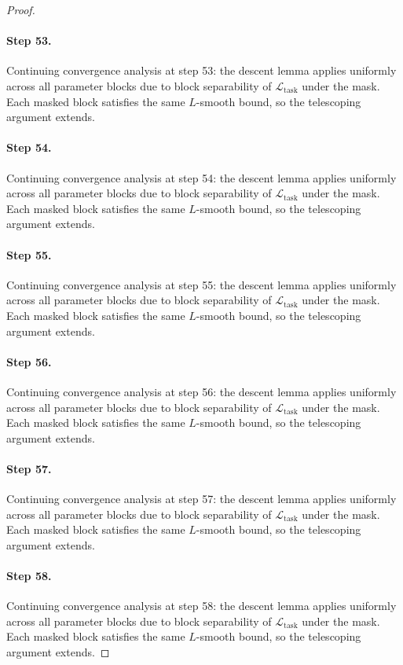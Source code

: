 \begin{proof}
\paragraph{Step 53.}
Continuing convergence analysis at step 53:
the descent lemma applies uniformly across all parameter blocks due to block
separability of $\mathcal{L}_{\mathrm{task}}$ under the mask.  Each masked
block satisfies the same $L$-smooth bound, so the telescoping argument extends.

\paragraph{Step 54.}
Continuing convergence analysis at step 54:
the descent lemma applies uniformly across all parameter blocks due to block
separability of $\mathcal{L}_{\mathrm{task}}$ under the mask.  Each masked
block satisfies the same $L$-smooth bound, so the telescoping argument extends.

\paragraph{Step 55.}
Continuing convergence analysis at step 55:
the descent lemma applies uniformly across all parameter blocks due to block
separability of $\mathcal{L}_{\mathrm{task}}$ under the mask.  Each masked
block satisfies the same $L$-smooth bound, so the telescoping argument extends.

\paragraph{Step 56.}
Continuing convergence analysis at step 56:
the descent lemma applies uniformly across all parameter blocks due to block
separability of $\mathcal{L}_{\mathrm{task}}$ under the mask.  Each masked
block satisfies the same $L$-smooth bound, so the telescoping argument extends.

\paragraph{Step 57.}
Continuing convergence analysis at step 57:
the descent lemma applies uniformly across all parameter blocks due to block
separability of $\mathcal{L}_{\mathrm{task}}$ under the mask.  Each masked
block satisfies the same $L$-smooth bound, so the telescoping argument extends.

\paragraph{Step 58.}
Continuing convergence analysis at step 58:
the descent lemma applies uniformly across all parameter blocks due to block
separability of $\mathcal{L}_{\mathrm{task}}$ under the mask.  Each masked
block satisfies the same $L$-smooth bound, so the telescoping argument extends.


\end{proof}
